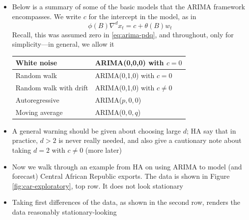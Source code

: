 \documentclass{article}
\begin{document}
\begin{itemize}
\item Below is a summary of some of the basic models that the ARIMA framework
  encompasses. We write $c$ for the intercept in the model, as in 
  \begin{equation}
  \label{eq:arima-pdq-c}
  \phi(B) \nabla^d x_t = c + \theta(B) w_t
  \end{equation}
  Recall, this was assumed zero in \eqref{eq:arima-pdq}, and throughout, only
  for simplicity---in general, we allow it 

  \begin{center} \smallskip
  \begin{tabular}{|l|l|}
  \hline
  White noise & ARIMA(0,0,0) with $c=0$ \\
  \hline
  Random walk & ARIMA(0,1,0) with $c=0$ \\
  \hline 
  Random walk with drift & ARIMA(0,1,0) with $c \not= 0$ \\
  \hline
  Autoregressive & ARIMA($p,0,0$) \\
  \hline
  Moving average & ARIMA($0,0,q$) \\
  \hline
  \end{tabular} \smallskip
  \end{center}

\item A general warning should be given about choosing large $d$; HA say that in
  practice, $d > 2$ is never really needed, and also give a cautionary note
  about taking $d = 2$ with $c \not= 0$ (more later)

\item Now we walk through an example from HA on using ARIMA to model (and
  forecast) Central African Republic exports. The data is shown in Figure
  \ref{fig:car-exploratory}, top row. It does not look stationary  

\item Taking first differences of the data, as shown in the second row, renders
  the data reasonably stationary-looking 


\end{itemize}
\end{document}
